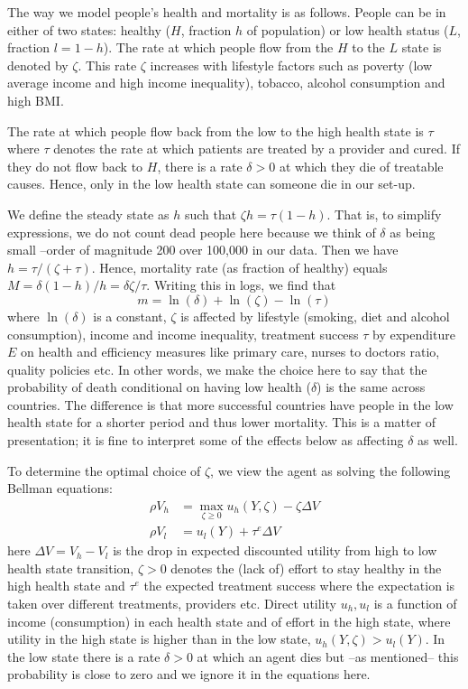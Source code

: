 \documentclass[12pt,english,a4paper]{article}
\begin{document}
The way we model people's health and mortality is as follows. People can be in either of two states: healthy (\(H\), fraction \(h\) of population) or low health status (\(L\), fraction \(l=1-h\)). The rate at which people flow from the \(H\) to the \(L\) state is denoted by \(\zeta\). This rate \(\zeta\) increases with lifestyle factors such as poverty (low average income and high income inequality), tobacco, alcohol consumption and high BMI.

The rate at which people flow back from the low to the high health state is \(\tau\) where \(\tau\) denotes the rate at which patients are treated by a provider and cured. If they do not flow back to \(H\), there is a rate \(\delta > 0\) at which they die of treatable causes. Hence, only in the low health state can someone die in our set-up.

We define the steady state as \(h\) such that \(\zeta h = \tau (1-h)\). That is, to simplify expressions, we do not count dead people here because we think of \(\delta\) as being small --order of magnitude 200 over 100,000 in our data. Then we have \(h =\tau/(\zeta+\tau)\). Hence, mortality rate (as fraction of healthy) equals \(M = \delta (1-h)/h = \delta \zeta/\tau\). Writing this in logs, we find that
\begin{equation}
\label{eq:1}
m = \ln(\delta) + \ln(\zeta) - \ln(\tau)
\end{equation}
where \(\ln(\delta)\) is a constant, \(\zeta\) is affected by lifestyle (smoking, diet and alcohol consumption), income and income inequality, treatment success \(\tau\) by expenditure \(E\) on health and efficiency measures like primary care, nurses to doctors ratio, quality policies etc. In other words, we make the choice here to say that the probability of death conditional on having low health (\(\delta\)) is the same across countries. The difference is that more successful countries have people in the low health state for a shorter period and thus lower mortality. This is a matter of presentation; it is fine to interpret some of the effects below as affecting \(\delta\) as well.

To determine the optimal choice of \(\zeta\), we view the agent as solving the following Bellman equations:
\begin{align}
\label{eq:4}
\rho V_h &= \max_{\zeta \geq 0} u_h(Y,\zeta) - \zeta \Delta V \\
\label{eq:4b}
\rho V_l &= u_l(Y) + \tau^{e} \Delta V
\end{align}
here \(\Delta V = V_h - V_l\) is the drop in expected discounted utility from high to low health state transition, \(\zeta>0\) denotes the (lack of) effort to stay healthy in the high health state and \(\tau^e\) the expected treatment success where the expectation is taken over different treatments, providers etc. Direct utility \(u_h,u_l\) is a function of income (consumption) in each health state and of effort in the high state, where utility in the high state is higher than in the low state, \(u_h(Y,\zeta) > u_l(Y)\). In the low state there is a rate \(\delta > 0\) at which an agent dies but --as mentioned-- this probability is close to zero and we ignore it in the equations here.  
\end{document}
